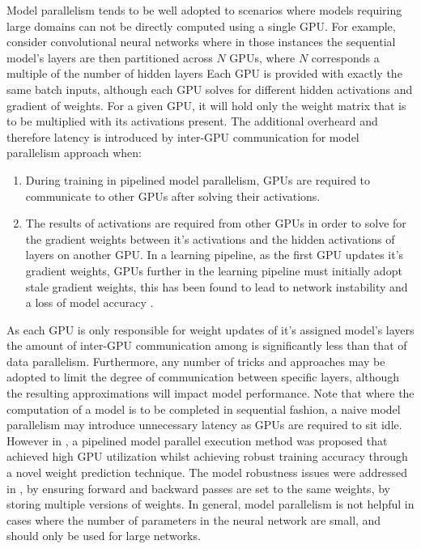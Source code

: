 \documentclass[10pt]{article}[draft]
\begin{document}
 Model parallelism  tends to be well adopted to scenarios  where  models requiring large domains can not be directly computed using a single GPU. For example, consider convolutional neural networks where in those instances the sequential model's layers are then partitioned across $N$ GPUs, where $N$ corresponds a multiple of the number of hidden layers \cite{[76] A. Coates and A. Ng. Learning feature representations with k-means. Neural networks: Tricks of the Trade} Each GPU is provided with exactly the same batch inputs, although each GPU solves for different hidden activations and gradient of weights. For a given GPU, it will hold only the weight matrix that is to be  multiplied with its  activations present. The additional overheard and therefore latency is introduced by inter-GPU communication for  model parallelism approach when:
 \begin{enumerate}
\item  During training  in pipelined model parallelism, GPUs are required to communicate to other GPUs after solving their activations. 
 \item The results of  activations are required from other GPUs  in order to solve for the gradient weights between it's activations and the hidden activations of  layers on another GPU. In a learning pipeline, as the first GPU updates it's gradient weights, GPUs further in the learning pipeline must initially adopt stale gradient weights, this  has been found to lead to network instability and a loss of model accuracy \cite{https://arxiv.org/pdf/1809.02839.pdf}. 
  \end{enumerate}
As each GPU is only responsible for  weight updates of it's assigned model's layers the amount of inter-GPU communication among  is significantly less than that of data parallelism. Furthermore, any number of tricks and approaches may be adopted to limit the degree of communication between specific layers, although the resulting approximations will impact model performance. Note that where the computation of a model is to be completed in sequential fashion, a naive model parallelism may introduce unnecessary latency as GPUs are required to sit idle. However in \cite{https://arxiv.org/pdf/1809.02839.pdf}, a pipelined model parallel execution method was proposed that achieved high GPU utilization whilst achieving robust training accuracy through a novel weight prediction technique. The model robustness issues were addressed in \cite{Pipedream: Fast and efficient pipeline parallel DNN
training.}, by ensuring forward and backward passes are set to the same weights, by storing multiple versions of weights. In general, model parallelism is not helpful in cases where the number of parameters in the neural network are small, and should only be used for large networks. 
\end{document}
